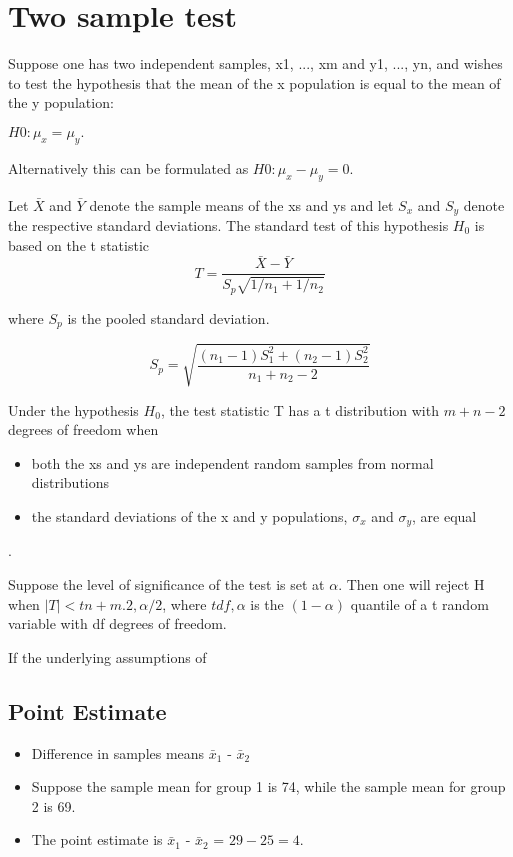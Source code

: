 \documentclass[]{report}
\begin{document}
\section{Two sample test}
Suppose one has two independent samples, x1, ..., xm and y1, ...,
yn, and wishes to test the hypothesis that the mean of the x
population is equal to the mean of the y population:

$H0 : \mu_{x} = \mu_{y}.$

Alternatively this can be formulated as $H0 : \mu_{x} - \mu_{y} =
0$.

Let $\bar{X}$ and $\bar{Y}$ denote the sample means of the xs and
ys and let $S_{x}$ and $S_{y}$ denote the respective standard
deviations. The standard test of this hypothesis $H_{0}$ is based
on the t statistic
\begin{equation}T = \frac{\bar{X} - \bar{Y} }{S_{p} \sqrt{1/n_1 + 1/n_2} }
\end{equation}

where $S_{p}$ is the pooled standard deviation.

\begin{equation}
S_{p} = \sqrt{ \frac{(n_1-1)S^{2}_{1} +  (n_2-1)S^{2}_{2}}{n_1 + n_2 - 2}}
\end{equation}

Under the hypothesis $H_{0}$, the test statistic T has a t
distribution with $m + n - 2$ degrees of freedom when
\begin{itemize} \item both the xs and ys are independent random samples
from normal distributions \item the standard deviations of the x
and y populations, $\sigma_{x}$ and $\sigma_{y}$, are equal
\end{itemize}.

Suppose the level of significance of the test is set at $\alpha$.
Then one will reject H when $|T| < tn+m.2,\alpha/2$, where
$tdf,\alpha$ is the $(1 - \alpha)$ quantile of a t random variable
with df degrees of freedom.

If the underlying assumptions of









\subsection*{Point Estimate}
\begin{itemize}
\item Difference in samples means $\bar{x}_1$ - $\bar{x}_2$
\item Suppose the sample mean for group 1 is 74, while the sample mean for
group 2 is 69.
\item The point estimate is $\bar{x}_1$ - $\bar{x}_2$ = $29 - 25 = 4$.
\end{itemize}
\end{document}
